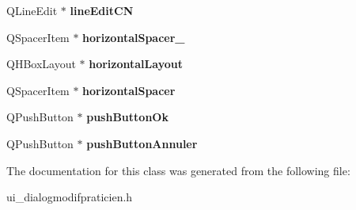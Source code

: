 \begin{DoxyCompactItemize}
\item 
\hypertarget{classUi__DialogModifPraticien_a3838b5bd798f8106fcd7fd87ec67278e}{Q\-Line\-Edit $\ast$ {\bfseries line\-Edit\-C\-N}}\label{classUi__DialogModifPraticien_a3838b5bd798f8106fcd7fd87ec67278e}

\item 
\hypertarget{classUi__DialogModifPraticien_af7399b57f1024452ad570a04548b6673}{Q\-Spacer\-Item $\ast$ {\bfseries horizontal\-Spacer\-\_}}\label{classUi__DialogModifPraticien_af7399b57f1024452ad570a04548b6673}

\item 
\hypertarget{classUi__DialogModifPraticien_a288ed93851e180702fddd74ac6d263d3}{Q\-H\-Box\-Layout $\ast$ {\bfseries horizontal\-Layout}}\label{classUi__DialogModifPraticien_a288ed93851e180702fddd74ac6d263d3}

\item 
\hypertarget{classUi__DialogModifPraticien_a635125f62494b287a2abebc4f0243264}{Q\-Spacer\-Item $\ast$ {\bfseries horizontal\-Spacer}}\label{classUi__DialogModifPraticien_a635125f62494b287a2abebc4f0243264}

\item 
\hypertarget{classUi__DialogModifPraticien_afb0bf0a7336b5f19b6a11fb881573ffa}{Q\-Push\-Button $\ast$ {\bfseries push\-Button\-Ok}}\label{classUi__DialogModifPraticien_afb0bf0a7336b5f19b6a11fb881573ffa}

\item 
\hypertarget{classUi__DialogModifPraticien_a7902da557540de676f5c939a907be786}{Q\-Push\-Button $\ast$ {\bfseries push\-Button\-Annuler}}\label{classUi__DialogModifPraticien_a7902da557540de676f5c939a907be786}

\end{DoxyCompactItemize}


The documentation for this class was generated from the following file\-:\begin{DoxyCompactItemize}
\item 
ui\-\_\-dialogmodifpraticien.\-h\end{DoxyCompactItemize}
